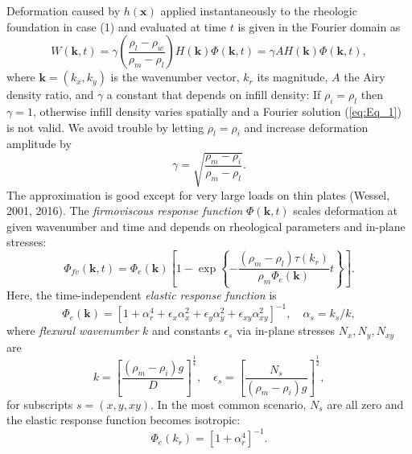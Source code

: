 \documentclass[12pt]{article}
\begin{document}
Deformation caused by $h(\mathbf{x})$ applied instantaneously to the
rheologic foundation in case (1) and evaluated at time $t$ is given in the Fourier domain as
\begin{equation}
W(\mathbf{k},t) = \gamma \left (\frac{\rho_l - \rho_w}{\rho_m - \rho_l} \right ) H(\mathbf{k}) \Phi(\mathbf{k},t) = \gamma A H(\mathbf{k}) \Phi(\mathbf{k},t),
\label{eq:Eq_1}
\end{equation}
where $\mathbf{k} = (k_x, k_y)$ is the wavenumber vector, $k_r$ its magnitude, $A$ the Airy density ratio,
and $\gamma$ a constant that depends on infill density: If $\rho_i = \rho_l$ then $\gamma = 1$,
otherwise infill density varies spatially and a Fourier solution (\ref{eq:Eq_1}) is not valid.
We avoid trouble by letting $\rho_l = \rho_i$ and increase deformation amplitude by
\begin{equation}
\gamma = \sqrt{\frac{\rho_m - \rho_i}{\rho_m - \rho_l}}.
\label{eq:Eq_3}
\end{equation}
The approximation is good except for very large loads on thin plates (Wessel, 2001, 2016).
The {\it firmoviscous response function} $\Phi(\mathbf{k},t)$ scales deformation at given wavenumber and time
and depends on rheological parameters and in-plane stresses:
\begin{equation}
\Phi_{fv}(\mathbf{k},t) = \Phi_e(\mathbf{k}) \left [ 1 - \exp \left \{ - \frac{(\rho_m - \rho_l) \tau(k_r)}{\rho_m\Phi_e(\mathbf{k})} t \right \} \right ].
\end{equation}
Here, the time-independent {\it elastic response function} is
\begin{equation}
\Phi_e(\mathbf{k}) = \left [ 1 + \alpha_r^4 + \epsilon_x \alpha_x^2 + \epsilon_y \alpha_y^2 + \epsilon_{xy} \alpha_{xy}^2 \right ]^{-1}, \quad \alpha_s = k_s / k,
\label{eq:Eq_5}
\end{equation}
where {\it flexural wavenumber} $k$ and constants $\epsilon_s$ via in-plane stresses $N_x, N_y, N_{xy}$ are
\begin{equation}
k = \left [ \frac{(\rho_m - \rho_i)g}{D} \right ]^{\frac{1}{4}}, \quad \epsilon_s = \left [ \frac{N_s}{(\rho_m - \rho_i)g} \right ]^{\frac{1}{2}},
\label{eq:Eq_7}
\end{equation}
for subscripts $s = \left (x, y, xy \right )$.
In the most common scenario, $N_s$ are all zero and the elastic response function becomes isotropic:
\begin{equation}
\Phi_e(k_r) = \left [ 1 + \alpha_r^4 \right ]^{-1}.
\label{eq:Eq_9}
\end{equation}
\end{document}
